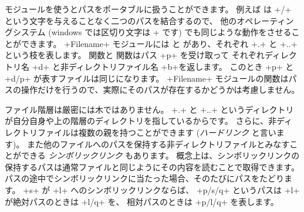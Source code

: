  モジュールを使うとパスをポータブルに扱うことができます。
例えば  は \ml+/+ という文字を与えることなく二つのパスを結合するので、
他のオペレーティングシステム (windows では区切り文字は \ml+\+ です) でも同じような動作をさせることができます。
\ml+Filename+ モジュールには  と
 があり、それぞれ \ml+.+ と \ml+..+ という枝を表します。
 関数と  関数はパス \ml+p+ を受け取って
それぞれディレクトリ名 \ml+d+ と非ディレクトリファイル名 \ml+b+を返します。
このとき \ml+p+ と \ml+d/p+ が表すファイルは同じになります。
\ml+Filename+ モジュールの関数はパスの操作だけを行うので、実際にそのパスが存在するかどうかは考慮しません。

ファイル階層は厳密には木ではありません。
\ml+.+ と \ml+..+ というディレクトリが自分自身や上の階層のディレクトリを指しているからです。
さらに、非ディレクトリファイルは複数の親を持つことができます (\emph{ハードリンク} と言います)。
また他のファイルへのパスを保持する非ディレクトリファイルとみなすことができる \emph{シンボリックリンク} もあります。
概念上は、シンボリックリンクの保持するパスは通常ファイルと同じようにその内容を読むことで取得できます。
パスの途中でシンボリックリンクに当たった場合、そのたびにパスをたどります。
\ml+s+ が \ml+l+ へのシンボリックリンクならば、 \ml+p/s/q+ というパスは \ml+l+ が絶対パスのときは \ml+l/q+ を、
相対パスのときは \ml+p/l/q+ を表します。

